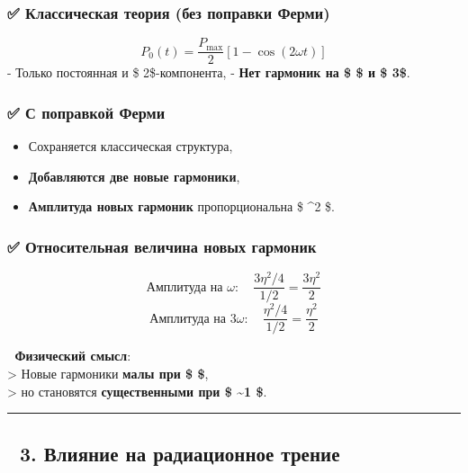\documentclass[11pt]{article}
\providecommand{\tightlist}{%
      \setlength{\itemsep}{0pt}\setlength{\parskip}{0pt}}
\begin{document}
\subsubsection{✅ Классическая теория (без поправки
Ферми)}\label{ux43aux43bux430ux441ux441ux438ux447ux435ux441ux43aux430ux44f-ux442ux435ux43eux440ux438ux44f-ux431ux435ux437-ux43fux43eux43fux440ux430ux432ux43aux438-ux444ux435ux440ux43cux438}

\[
P_0(t) = \frac{P_{\text{max}}}{2} \left[ 1 - \cos(2\omega t) \right]
\] - Только постоянная и \$ 2\omega \$-компонента, - \textbf{Нет
гармоник на \$ \omega \$ и \$ 3\omega \$}.

\subsubsection{✅ С поправкой
Ферми}\label{ux441-ux43fux43eux43fux440ux430ux432ux43aux43eux439-ux444ux435ux440ux43cux438-2}

\begin{itemize}
\tightlist
\item
  Сохраняется классическая структура,
\item
  \textbf{Добавляются две новые гармоники},
\item
  \textbf{Амплитуда новых гармоник} пропорциональна \$ \eta\^{}2 \$.
\end{itemize}

\subsubsection{✅ Относительная величина новых
гармоник}\label{ux43eux442ux43dux43eux441ux438ux442ux435ux43bux44cux43dux430ux44f-ux432ux435ux43bux438ux447ux438ux43dux430-ux43dux43eux432ux44bux445-ux433ux430ux440ux43cux43eux43dux438ux43a}

\[
\text{Амплитуда на } \omega: \quad \frac{3\eta^2 / 4}{1/2} = \frac{3\eta^2}{2}
\] \[
\text{Амплитуда на } 3\omega: \quad \frac{\eta^2 / 4}{1/2} = \frac{\eta^2}{2}
\]

📌 \textbf{Физический смысл}:\\
\textgreater{} Новые гармоники \textbf{малы при \$ \eta {} \$},\\
\textgreater{} но становятся \textbf{существенными при \$ \eta \sim 1
\$}.

\begin{center}\rule{0.5\linewidth}{\linethickness}\end{center}

\subsection{🔹 3. Влияние на радиационное
трение}\label{ux432ux43bux438ux44fux43dux438ux435-ux43dux430-ux440ux430ux434ux438ux430ux446ux438ux43eux43dux43dux43eux435-ux442ux440ux435ux43dux438ux435}
\end{document}
